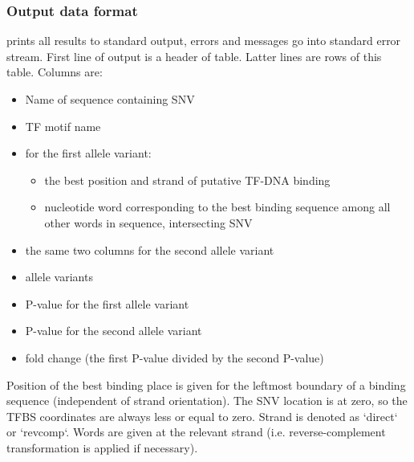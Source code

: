 \example{}

\subsubsection{Output data format}

 prints all results to standard output, errors and messages go into standard error stream. First line of output is a header of table. Latter lines are rows of this table. Columns are:
\begin{itemize}
\item Name of sequence containing SNV
\item TF motif name
\item for the first allele variant:
\begin{itemize}
\item   the best position and strand of putative TF-DNA binding
\item   nucleotide word corresponding to the best binding sequence among all other words in sequence, intersecting SNV
\end{itemize}
\item the same two columns for the second allele variant
\item allele variants
\item P-value for the first allele variant
\item P-value for the second allele variant
\item fold change (the first P-value divided by the second P-value)
\end{itemize}

Position of the best binding place is given for the leftmost boundary of a binding sequence (independent of strand orientation). The SNV location is at zero, so the TFBS coordinates are always less or equal to zero. Strand is denoted as `direct` or `revcomp`. Words are given at the relevant strand (i.e. reverse-complement transformation is applied if necessary).
